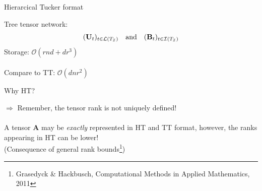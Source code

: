 \documentclass{beamer}
\newcommand{\bvec}[1]{\mathbf{#1}}
\newcommand{\vA}{\bvec{A}}
\newcommand{\vB}{\bvec{B}}
\newcommand{\vU}{\bvec{U}}
\begin{document}
\begin{frame}{Hierarcical Tucker format}

Tree tensor network:
$$(\vU_t)_{t\in\mathcal{L}(T_{\mathcal{I}})}
\quad {\rm and}\quad 
(\vB_t)_{t\in\mathcal{I}(T_{\mathcal{I}})}$$
Storage: \pause
$\mathcal{O}(rnd + dr^3)$ \\
~\\
Compare to TT:
$\mathcal{O}(dnr^2)$

\begin{center}
Why HT?
\end{center}
\pause
$\Rightarrow$ Remember, the tensor rank is not uniquely defined!\\~
~\\
A tensor $\vA$ may be {\it exactly} represented in HT and TT format, however, the ranks appearing in HT can be lower!\\
(Consequence of general rank bounds\footnote{Grasedyck \& Hackbusch, Computational Methods in Applied Mathematics, 2011})
\end{frame}
\end{document}
